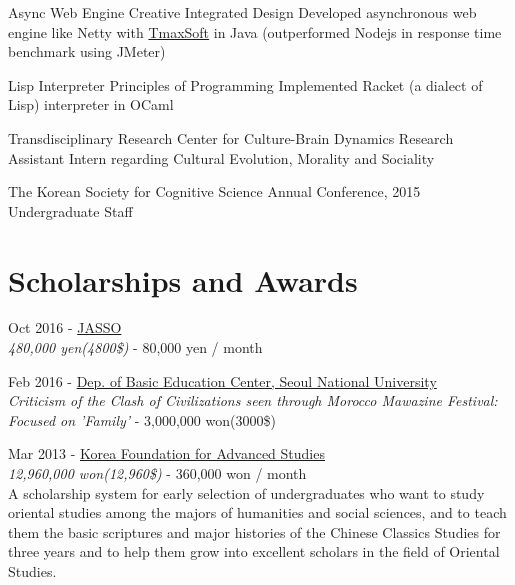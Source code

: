 \documentclass[10pt]{article} %
\begin{document}
\if{}
\project
{}
{Async Web Engine}
{Creative Integrated Design}
{Developed asynchronous web engine like Netty with \href{https://kr.tmaxsoft.com/main.do}{TmaxSoft} in Java (outperformed Nodejs in response time benchmark using JMeter)}

\project
{}
{Lisp Interpreter}
{Principles of Programming}
{Implemented Racket (a dialect of Lisp) interpreter in OCaml}
\fi

\if{}
\project
{}
{Transdisciplinary Research Center for Culture-Brain Dynamics}
{Research Assistant Intern}
{regarding Cultural Evolution, Morality and Sociality}

\project
{}
{The Korean Society for Cognitive Science Annual Conference, 2015}
{Undergraduate Staff}
{}
\fi


\if{}
\section{Scholarships and Awards}

{
Oct 2016 - \href{http://www.jasso.go.jp/ryugaku/tantosha/study_a/short_term_h/index.html}{JASSO}\\
\textit{480,000 yen(4800\$)} - 80,000 yen / month
}

{
Feb 2016 - \href{http://liberaleduenglish.snu.ac.kr/}{Dep. of Basic Education Center, Seoul National University}\\
\textit{Criticism of the Clash of Civilizations seen through Morocco Mawazine Festival: Focused on 'Family'} - 3,000,000 won(3000\$)
}

{
Mar 2013 - \href{http://www.kfas.or.kr/?pCulture=en}{Korea Foundation for Advanced Studies}\\
\textit{12,960,000 won(12,960\$)} - 360,000 won / month\\
A scholarship system for early selection of undergraduates who want to study oriental studies among the majors of humanities and social sciences, and to teach them the basic scriptures and major histories of the Chinese Classics Studies for three years and to help them grow into excellent scholars in the field of Oriental Studies.
}
\end{document}
